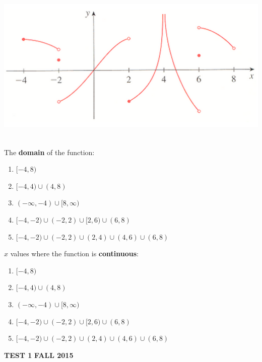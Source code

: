 \documentclass[fleqn,12pt]{article}
\newcommand{\<}{\ensuremath{\langle}}
\renewcommand{\>}{\ensuremath{\rangle}}
\begin{document}
\begin{enumerate}[label={\bf \arabic*.}]
    \begin{center}
      \includegraphics[height=3in]{Problem254}
    \end{center}
    
    \begin{multicols}{2}

      The {\bf domain} of the function:
    \begin{enumerate}[label=(\alph*)]
    \item $[-4, 8)$
    \item $[-4, 4)\cup(4,8)$
    \item $(-\infty, -4) \cup [8,\infty)$
    \item $[-4, -2)\cup(-2,2) \cup [2,6) \cup (6,8)$
      \item $[-4, -2)\cup(-2,2) \cup (2,4) \cup (4,6)\cup (6,8)$
    \end{enumerate}

    $x$ values where the function is {\bf continuous}:
    \begin{enumerate}[label=(\alph*)]
    \item $[-4, 8)$
    \item $[-4, 4)\cup(4,8)$
    \item $(-\infty, -4) \cup [8,\infty)$
    \item $[-4, -2)\cup(-2,2) \cup [2,6) \cup (6,8)$
      \item $[-4, -2)\cup(-2,2) \cup (2,4) \cup (4,6)\cup (6,8)$
    \end{enumerate}

    \end{multicols}
\end{enumerate}

\newpage

 \hfill {\bf TEST 1} \hfill {\bf FALL 2015}
\end{document}
